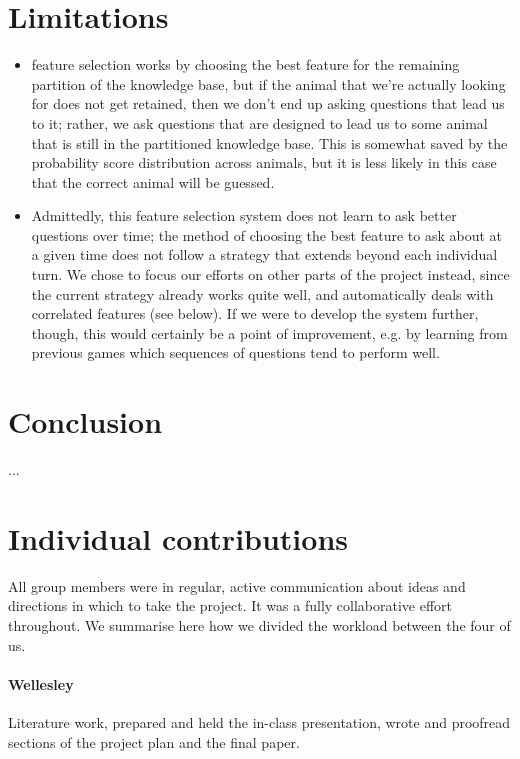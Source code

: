 \documentclass[11pt,a4paper]{article}
\begin{document}
\section{Limitations}
\label{sec:limit}

\begin{itemize}
\item feature selection works by choosing the best feature for the remaining partition of the knowledge base, but if the animal that we're actually looking for does not get retained, then we don't end up asking questions that lead us to it; rather, we ask questions that are designed to lead us to some animal that is still in the partitioned knowledge base. This is somewhat saved by the probability score distribution across animals, but it is less likely in this case that the correct animal will be guessed.
\item Admittedly, this feature selection system does not learn to ask better questions over time; the method of choosing the best feature to ask about at a given time does not follow a strategy that extends beyond each individual turn.
We chose to focus our efforts on other parts of the project instead, since the current strategy already works quite well, and automatically deals with correlated features (see below).
If we were to develop the system further, though, this would certainly be a point of improvement, e.g. by learning from previous games which sequences of questions tend to perform well.
\end{itemize}

\section{Conclusion}
\label{sec:concl}

...




\appendix

\section{Individual contributions}
\label{app:contributions}

All group members were in regular, active communication about ideas and directions in which to take the project.
It was a fully collaborative effort throughout.
We summarise here how we divided the workload between the four of us.

\paragraph{Wellesley} Literature work, prepared and held the in-class presentation, wrote and proofread sections of the project plan and the final paper.
\end{document}
